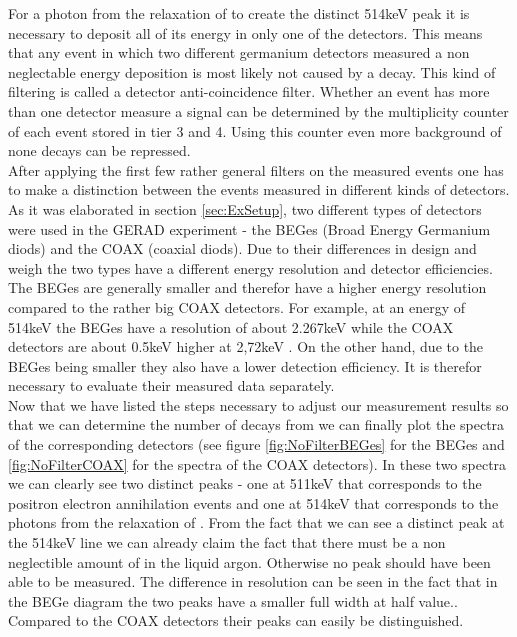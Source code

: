 For a photon from the relaxation of  to create the distinct 514keV peak it is necessary to deposit all of its energy in only one of the detectors. 
This means that any event in which two different germanium detectors measured a non neglectable energy deposition is most likely not caused by a \Kr decay.
This kind of filtering is called a detector anti-coincidence filter.
Whether an event has more than one detector measure a signal can be determined by the multiplicity counter of each event stored in tier 3 and 4.
Using this counter even more background of none \Kr decays can be repressed.
\\

After applying the first few rather general filters on the measured events one has to make a distinction between the events measured in different kinds of detectors.
As it was elaborated in section \ref{sec:ExSetup}, two different types of detectors were used in the GERAD experiment - the BEGes (Broad Energy Germanium diods) and the COAX (coaxial diods). 
Due to their differences in design and weigh the two types have a different energy resolution and detector efficiencies. 
The BEGes are generally smaller and therefor have a higher energy resolution compared to the rather big COAX detectors.
For example, at an energy of 514keV the BEGes have a resolution of about 2.267keV while the COAX detectors are about 0.5keV higher at 2,72keV \cite{agostini_allardt_bakalyarov_barabanov_baudis_bauer_bellotti_belogurov_belyaev_benato_et al._2017}. 
On the other hand, due to the BEGes being smaller they also have a lower detection efficiency.
It is therefor necessary to evaluate their measured data separately.
\\

Now that we have listed the steps necessary to adjust our measurement results so that we can determine the number of decays from we can finally plot the spectra of the corresponding detectors (see figure \ref{fig:NoFilterBEGes} for the BEGes and \ref{fig:NoFilterCOAX} for the spectra of the COAX detectors). 
In these two spectra we can clearly see two distinct peaks - one at 511keV that corresponds to the positron electron annihilation events and one at 514keV that corresponds to the photons from the relaxation of .
From the fact that we can see a distinct peak at the 514keV line we can already claim the fact that there must be a non neglectible amount of \Kr in the liquid argon.
Otherwise no peak should have been able to be measured. 
The difference in resolution can be seen in the fact that in the BEGe diagram the two peaks have a smaller full width at half value..
Compared to the COAX detectors their peaks can easily be distinguished.  
\\

